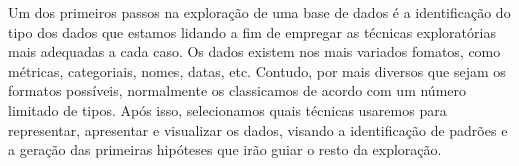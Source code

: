 Um dos primeiros passos na exploração de uma base de dados é a identificação do tipo dos
dados que estamos lidando a fim de empregar as técnicas exploratórias mais adequadas a
cada caso.
Os dados existem nos mais variados fomatos, como métricas, categoriais, nomes,
datas, etc.
Contudo, por mais diversos que sejam os formatos possíveis, normalmente os classicamos
de acordo com um número limitado de tipos.
Após isso, selecionamos quais técnicas usaremos para representar, apresentar e visualizar
os dados, visando a identificação de padrões e a geração das primeiras hipóteses que irão
guiar o resto da exploração.
